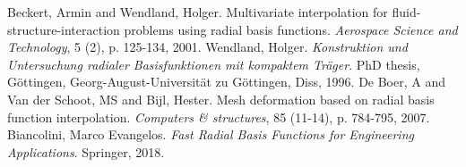 \documentclass[12pt,a4paper]{article}
\theoremstyle{plain}
\theoremstyle{definition}
\begin{document}





\begin{thebibliography}{2}
Beckert, Armin and Wendland, Holger. Multivariate interpolation for fluid-structure-interaction problems using radial basis functions. \textit{Aerospace Science and Technology}, 5 (2), p. 125-134, 2001.
Wendland, Holger. \textit{Konstruktion und Untersuchung radialer Basisfunktionen mit kompaktem Tr{\"a}ger}. PhD thesis, G{\"o}ttingen, Georg-August-Universit{\"a}t zu G{\"o}ttingen, Diss, 1996.
De Boer, A and Van der Schoot, MS and Bijl, Hester. Mesh deformation based on radial basis function interpolation. \textit{Computers \& structures}, 85 (11-14), p. 784-795, 2007.
Biancolini, Marco Evangelos. \textit{Fast Radial Basis Functions for Engineering Applications}. Springer, 2018.
\end{thebibliography}
\end{document}
